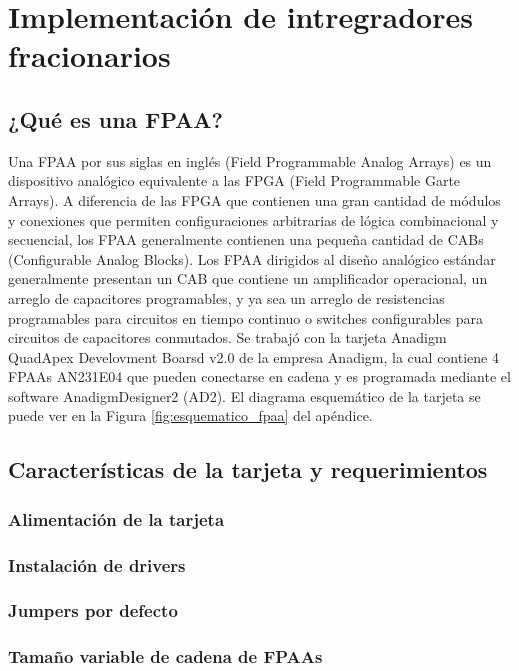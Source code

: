\chapter{Implementación de intregradores fracionarios}

	\section{¿Qué es una FPAA?}
	Una FPAA  por sus siglas en inglés (Field Programmable Analog Arrays) es un dispositivo analógico equivalente a las FPGA (Field Programmable Garte Arrays). A diferencia de las FPGA que contienen una gran cantidad de módulos y conexiones que permiten configuraciones arbitrarias de lógica combinacional y secuencial, los FPAA generalmente contienen una pequeña cantidad de CABs (Configurable Analog Blocks). Los FPAA dirigidos al diseño analógico estándar generalmente presentan un CAB que contiene un amplificador operacional, un arreglo de capacitores programables, y ya sea un arreglo de resistencias programables para circuitos en tiempo continuo o switches configurables para circuitos de capacitores conmutados.
	Se trabajó con la tarjeta Anadigm QuadApex Develovment Boarsd v2.0 de la empresa Anadigm, la cual contiene 4 FPAAs AN231E04 que pueden conectarse en cadena y es programada mediante el software AnadigmDesigner2 (AD2). El diagrama esquemático de la tarjeta se puede ver en la Figura \ref{fig:esquematico_fpaa} del apéndice.
	
	\section{Características de la tarjeta y requerimientos}
	
		\subsection{Alimentación de la tarjeta}
	
		\subsection{Instalación de drivers}

		\subsection{Jumpers por defecto}

		\subsection{Tamaño variable de cadena de FPAAs}

